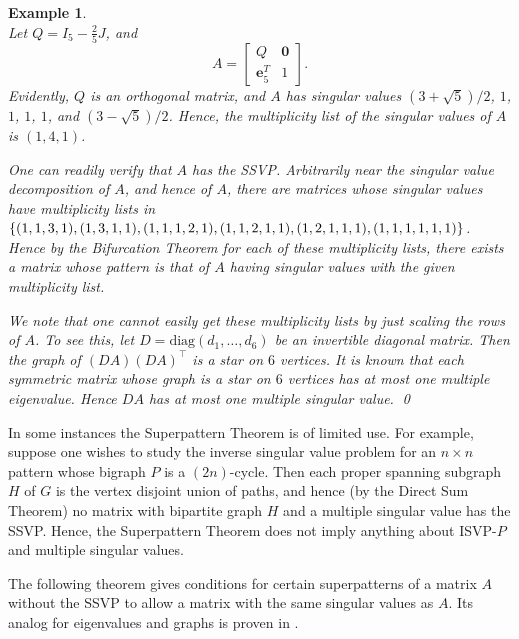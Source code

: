 \documentclass[preprint,12pt]{elsarticle}
\newcommand{\trans  }{^\top}
\newtheorem{Example}[theorem]{Example}
\begin{document}
\begin{Example}
\phantom{} \rm \\
Let $Q=I_5-\frac{2}{5}J$, and 
\[ 
A= \left[ \begin{array}{c|c}
Q & \mathbf 0 \\ \hline 
\mathbf e_5^T & 1
\end{array} \right]. 
\]
Evidently, $Q$ is an orthogonal matrix, 
and $A$ has singular values  
$(3+\sqrt{5})/2$, $1$, $1$, $1$, $1$, and $(3-\sqrt{5})/2$.
Hence, the multiplicity list of the singular values of $A$ is $(1,4,1)$. 

One can readily verify that $A$ has the SSVP.
Arbitrarily near the singular value decomposition of $A$,
and hence of $A$, there are matrices whose singular values 
have multiplicity lists in 
$ \{ (1,1,3,1),(1,3,1,1),(1,1,1,2,1),(1,1,2,1,1), \\(1,2,1,1,1), (1,1,1,1,1,1)\}$.
Hence by the Bifurcation Theorem for each of these 
multiplicity lists, there exists a matrix whose pattern is that of $A$ having singular values with the given multiplicity list.  

We note that one cannot easily get these multiplicity lists by just scaling the rows of $A$. To see this, 
let $D=\mbox{diag}(d_1,\ldots, d_6)$ be  an invertible diagonal matrix.  Then the graph of $(DA)(DA)\trans$
is a star on $6$ vertices.  It is known that each symmetric matrix 
whose graph is a star on $6$ vertices has at most one multiple eigenvalue.  Hence $DA$ has at most one multiple singular value. 
\qed
\end{Example}

In some instances the Superpattern Theorem is of limited use.  For example, suppose one wishes to study the inverse singular value problem for an $n\times n$ pattern whose bigraph $P$ is a $(2n)$-cycle.  Then each proper spanning subgraph $H$ of $G$ is the vertex disjoint union of paths, and hence (by the Direct Sum Theorem) no matrix with bipartite graph $H$ and a multiple singular value has the SSVP.  Hence, the Superpattern Theorem does not imply anything about ISVP-$P$ and multiple singular values.



The following theorem gives conditions for certain superpatterns of  a matrix $A$ without the SSVP to allow a matrix with the same singular values as $A$.
Its analog for eigenvalues and graphs 
is proven in \cite{FHLS}.  
\end{document}
